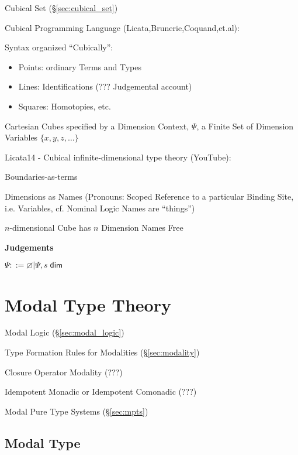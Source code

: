 Cubical Set (\S\ref{sec:cubical_set})

Cubical Programming Language (Licata,Brunerie,Coquand,et.al):

Syntax organized ``Cubically'':
\begin{itemize}
  \item Points: ordinary Terms and Types
  \item Lines: Identifications (??? Judgemental account)
  \item Squares: Homotopies, etc.
\end{itemize}

Cartesian Cubes specified by a Dimension Context, $\Psi$, a Finite Set
of Dimension Variables $\{x,y,z,\ldots\}$


Licata14 - Cubical infinite-dimensional type theory (YouTube):

Boundaries-as-terms

Dimensions as Names (Pronouns: Scoped Reference to a particular
Binding Site, i.e. Variables, cf. Nominal Logic Names are ``things'')

$n$-dimensional Cube has $n$ Dimension Names Free


\textbf{Judgements}

$\Psi ::= \varnothing | \Psi, s \;\mathsf{dim}$



\section{Modal Type Theory}\label{sec:modal_type_theory}

Modal Logic (\S\ref{sec:modal_logic})

Type Formation Rules for Modalities (\S\ref{sec:modality})

Closure Operator Modality (???)

Idempotent Monadic or Idempotent Comonadic (???)

Modal Pure Type Systems (\S\ref{sec:mpts})



\subsection{Modal Type}\label{sec:modal_type}

